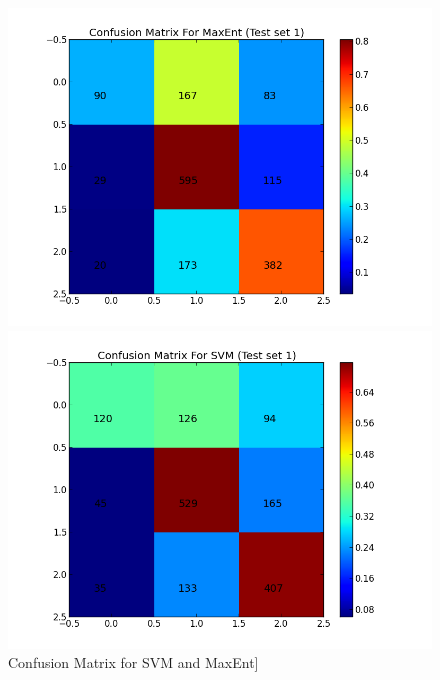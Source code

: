 \begin{figure}[htb]
	\centering
	\begin{minipage}{.45\linewidth}
		\includegraphics[width=\linewidth]{../img/plots/analysis/maxent_confusion_matrix_best.png}
	\end{minipage}
	\hspace{0.05\linewidth}
	\begin{minipage}{.45\linewidth}
		\includegraphics[width=\linewidth]{../img/plots/analysis/svm_confusion_matrix_best.png}
	\end{minipage}
	\caption[Confusion Matrix for SVM and MaxEnt]{Confusion Matrix for SVM and MaxEnt]}
	\label{fig:best_result_confusion}
\end{figure}





